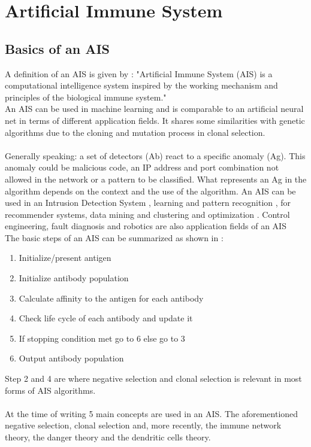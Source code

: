 \chapter{Artificial Immune System}
\label{chap:ais}
\section{Basics of an AIS}
A definition of an AIS is given by \cite[p. 5]{tan2016artificial}:
"Artificial Immune System (AIS) is a computational intelligence system inspired by the working mechanism and principles of the biological immune system."\\An AIS can be used in machine learning and is comparable to an artificial neural net in terms of different application fields.
It shares some similarities with genetic algorithms due to the cloning and mutation process in clonal selection.\\\\
Generally speaking: a set of detectors (Ab) react to a specific anomaly (Ag). This anomaly could be malicious code, an IP address and port combination not allowed in the network or a pattern to be classified. What represents an Ag in the algorithm depends on the context and the use of the algorithm. An AIS can be used in an Intrusion Detection System \cite{PAM17}, learning and pattern recognition \cite{DEC02}, for recommender systems, data mining and clustering \cite{burke2013} and optimization \cite{NAN08}. Control engineering, fault diagnosis and robotics are also application fields of an AIS \cite{tan2016artificial}\\

The basic steps of an AIS can be summarized as shown in \cite{tan2016artificial}:
\begin{enumerate}
	\item 	Initialize/present antigen
	\item 	Initialize antibody population
	\item 	Calculate affinity to the antigen for each antibody
	\item 	Check life cycle of each antibody and update it
	\item 	If stopping condition met go to 6 else go to 3
	\item 	Output antibody population
\end{enumerate}
Step 2 and 4 are where negative selection and clonal selection is relevant in most forms of AIS algorithms.\\\\
At the time of writing 5 main concepts are used in an AIS. The aforementioned negative selection, clonal selection and, more recently, the immune network theory, the danger theory and the dendritic cells theory. 

